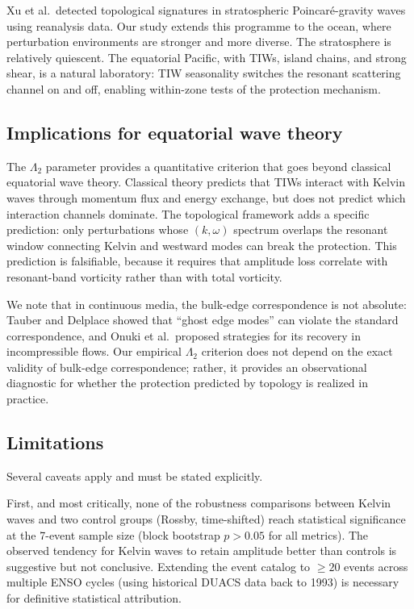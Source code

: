 \documentclass[11pt]{article}
\begin{document}
Xu et al.\ detected topological signatures in stratospheric Poincar\'e-gravity waves using reanalysis data\cite{Xu2024}. Our study extends this programme to the ocean, where perturbation environments are stronger and more diverse. The stratosphere is relatively quiescent. The equatorial Pacific, with TIWs, island chains, and strong shear\cite{Kessler2006}, is a natural laboratory: TIW seasonality switches the resonant scattering channel on and off, enabling within-zone tests of the protection mechanism.

\subsection{Implications for equatorial wave theory}

The $\Lambda_2$ parameter provides a quantitative criterion that goes beyond classical equatorial wave theory. Classical theory predicts that TIWs interact with Kelvin waves through momentum flux and energy exchange\cite{Vallis2017}, but does not predict which interaction channels dominate. The topological framework adds a specific prediction: only perturbations whose $(k, \omega)$ spectrum overlaps the resonant window connecting Kelvin and westward modes can break the protection. This prediction is falsifiable, because it requires that amplitude loss correlate with resonant-band vorticity rather than with total vorticity.

We note that in continuous media, the bulk-edge correspondence is not absolute: Tauber and Delplace showed that ``ghost edge modes'' can violate the standard correspondence\cite{Tauber2021}, and Onuki et al.\ proposed strategies for its recovery in incompressible flows\cite{Onuki2024}. Our empirical $\Lambda_2$ criterion does not depend on the exact validity of bulk-edge correspondence; rather, it provides an observational diagnostic for whether the protection predicted by topology is realized in practice.

\subsection{Limitations}

Several caveats apply and must be stated explicitly.

First, and most critically, none of the robustness comparisons between Kelvin waves and two control groups (Rossby, time-shifted) reach statistical significance at the 7-event sample size (block bootstrap $p > 0.05$ for all metrics). The observed tendency for Kelvin waves to retain amplitude better than controls is suggestive but not conclusive. Extending the event catalog to ${\geq}20$ events across multiple ENSO cycles (using historical DUACS data back to 1993) is necessary for definitive statistical attribution.
\end{document}
